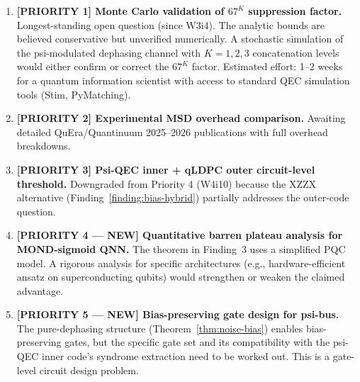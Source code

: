 \documentclass[11pt]{article}
\theoremstyle{definition}
\theoremstyle{remark}
\begin{document}
\begin{enumerate}

\item \textbf{[PRIORITY 1] Monte Carlo validation of $67^K$ suppression
  factor.}
  Longest-standing open question (since W3i4).  The analytic bounds are
  believed conservative but unverified numerically.  A stochastic
  simulation of the psi-modulated dephasing channel with $K = 1, 2, 3$
  concatenation levels would either confirm or correct the $67^K$ factor.
  Estimated effort: 1--2 weeks for a quantum information scientist with
  access to standard QEC simulation tools (Stim, PyMatching).

\item \textbf{[PRIORITY 2] Experimental MSD overhead comparison.}
  Awaiting detailed QuEra/Quantinuum 2025--2026 publications with full
  overhead breakdowns.

\item \textbf{[PRIORITY 3] Psi-QEC inner + qLDPC outer circuit-level
  threshold.}
  Downgraded from Priority 4 (W4i10) because the XZZX alternative
  (Finding~\ref{finding:bias-hybrid}) partially addresses the outer-code
  question.

\item \textbf{[PRIORITY 4 --- NEW] Quantitative barren plateau analysis
  for MOND-sigmoid QNN.}
  The theorem in Finding~3 uses a simplified PQC model.  A rigorous
  analysis for specific architectures (e.g., hardware-efficient ansatz
  on superconducting qubits) would strengthen or weaken the claimed
  advantage.

\item \textbf{[PRIORITY 5 --- NEW] Bias-preserving gate design for psi-bus.}
  The pure-dephasing structure (Theorem~\ref{thm:noise-bias}) enables
  bias-preserving gates, but the specific gate set and its compatibility
  with the psi-QEC inner code's syndrome extraction need to be worked out.
  This is a gate-level circuit design problem.

\end{enumerate}
\end{document}
